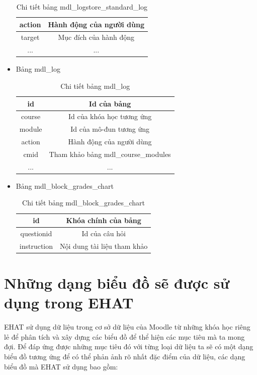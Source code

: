 \begin{itemize}
\begin{center}
\begin{table}[!htp]
\begin{tabular}{|c|c|}
				\hline
				action & Hành động của người dùng \\
				\hline 
				target & Mục đích của hành động \\
				\hline
				... & ... \\ 
				\hline 
			\end{tabular} 
			\caption{Chi tiết bảng mdl\_logstore\_standard\_log}
			\label{bang17}
		\end{table}
	\end{center}
	\item Bảng mdl\_log
	\begin{center}
		\begin{table}[!htp]
			\centering
			\begin{tabular}{|c|c|}
				\hline 
				id & Id của bảng \\ 
				\hline 
				course & Id của khóa học tương ứng \\ 
				\hline
				module & Id của mô-đun tương ứng \\
				\hline
				action & Hành động của người dùng \\
				\hline 
				cmid & Tham khảo bảng mdl\_course\_modules \\
				\hline
				... & ... \\ 
				\hline 
			\end{tabular} 
			\caption{Chi tiết bảng mdl\_log}
			\label{bang18}
		\end{table}
	\end{center}
	
	\item Bảng mdl\_block\_grades\_chart
	\begin{center}
		\begin{table}[!htp]
			\centering
			\begin{tabular}{|c|c|}
				\hline 
				id & Khóa chính của bảng \\ 
				\hline 
				questionid & Id của câu hỏi \\ 
				\hline
				instruction & Nội dung tài liệu tham khảo \\
				\hline 
			\end{tabular} 
			\caption{Chi tiết bảng mdl\_block\_grades\_chart}
			\label{bang19}
		\end{table}
	\end{center}
\end{itemize}

\newpage
\section{Những dạng biểu đồ sẽ được sử dụng trong EHAT}
EHAT sử dụng dữ liệu trong cơ sở dữ liệu của Moodle từ những khóa học riêng lẻ để phân tích và xây dựng các biểu đồ để thể hiện các mục tiêu mà ta mong đợi. Để đáp ứng được những mục tiêu đó với từng loại dữ liệu ta sẽ có một dạng biểu đồ tương ứng để có thể phản ảnh rõ nhất đặc điểm của dữ liệu, các dạng biểu đồ mà EHAT sử dụng bao gồm:


